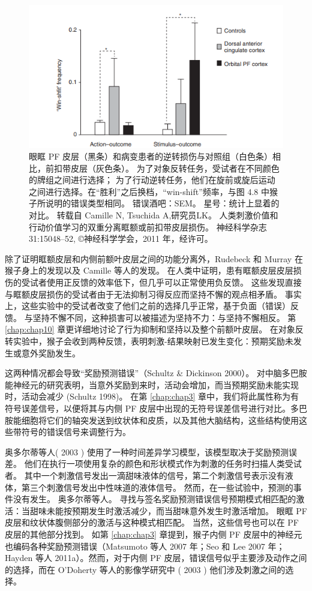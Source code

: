 \begin{figure}[!htb]
	\centering
	\includegraphics{image_pfc/Fig_4_9}
	\caption{眼眶 PF 皮层（黑条）和病变患者的逆转损伤与对照组（白色条）相比，前扣带皮层（灰色条）。 为了对象反转任务，受试者在不同颜色的牌组之间进行选择； 为了行动逆转任务，他们在旋前或旋后运动之间进行选择。在“胜利”之后换档，“win-shift”频率，与图 4.8 中猴子所说明的错误类型相同。 错误酒吧：SEM。 星号：统计上显着的对比。 转载自 Camille N, Tsuchida A,研究员LK。 人类刺激价值和行动价值学习的双重分离眶额或前扣带皮层损伤。 神经科学杂志 31:15048–52, ©神经科学学会，2011 年，经许可。}
	\label{fig:fig_4_9}
\end{figure}


除了证明眶额皮层和内侧前额叶皮层之间的功能分离外，Rudebeck 和 Murray 在猴子身上的发现以及 Camille 等人的发现。
在人类中证明，患有眶额皮层皮层损伤的受试者使用正反馈的效率低下，但几乎可以正常使用负反馈。
这些发现直接与眶额皮层损伤的受试者由于无法抑制习得反应而坚持不懈的观点相矛盾。
事实上，这些实验中的受试者改变了他们之前的选择几乎正常，基于负面（错误）反馈。
与坚持不懈不同，这种损害可以被描述为坚持不力：与坚持不懈相反。
第 \ref{chap:chap10} 章更详细地讨论了行为抑制和坚持以及整个前额叶皮层。
在对象反转实验中，猴子会收到两种反馈，表明刺激-结果映射已发生变化：预期奖励未发生或意外奖励发生。\par
这两种情况都会导致“奖励预测错误”（Schultz \& Dickinson 2000）。
对中脑多巴胺能神经元的研究表明，当意外奖励到来时，活动会增加，而当预期奖励未能实现时，活动会减少 (Schultz 1998)。
在第 \ref{chap:chap3} 章中，我们将此属性称为有符号误差信号，以便将其与内侧 PF 皮层中出现的无符号误差信号进行对比。多巴胺能细胞将它们的轴突发送到纹状体和皮质，以及其他大脑结构，这些结构使用这些带符号的错误信号来调整行为。\par
奥多尔蒂等人( 2003 ) 使用了一种时间差异学习模型，该模型取决于奖励预测误差。 他们在执行一项使用复杂的颜色和形状模式作为刺激的任务时扫描人类受试者。 其中一个刺激信号发出一滴甜味液体的信号，第二个刺激信号表示没有液体，第三个刺激信号发出中性味道的液体信号。 然而，在一些试验中，预测的事件没有发生。 奥多尔蒂等人。 寻找与签名奖励预测错误信号预期模式相匹配的激活：当甜味未能按预期发生时激活减少，而当甜味意外发生时激活增加。 眼眶 PF 皮层和纹状体腹侧部分的激活与这种模式相匹配。
当然，这些信号也可以在 PF 皮层的其他部分找到。 如第 \ref{chap:chap3} 章提到，猴子内侧 PF 皮层中的神经元也编码各种奖励预测错误（Matsumoto 等人 2007 年；Seo 和 Lee 2007 年；Hayden 等人 2011a）。然而，对于内侧 PF 皮层，错误信号似乎主要涉及动作之间的选择，而在 O'Doherty 等人的影像学研究中 ( 2003 ) 他们涉及刺激之间的选择。\par

